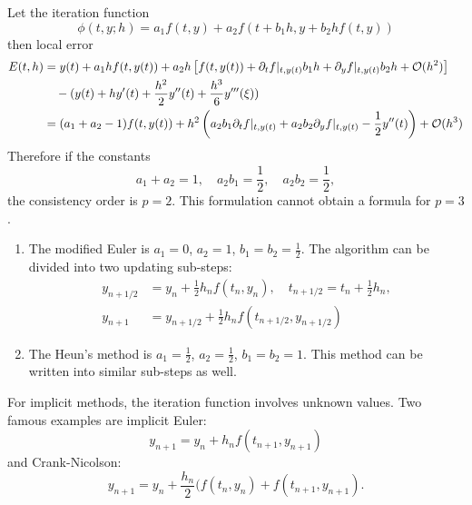 \begin{example}
    Let the iteration function $$\phi(t, y;h) = a_1 f(t, y ) + a_2f( t+b_1h, y+b_2 hf(t, y))$$
    then local error
    \begin{equation}\nonumber
        \begin{aligned}
            E(t, h) &= y(t) + a_1 h f(t, y(t)) + a_2 h \left[ f(t, y(t)) + \partial_t f|_{t,y(t)} b_1 h + \partial_y f|_{t, y(t)} b_2 h +\mathcal O(h^2) \right]\\
            &\quad - (y(t) + h y'(t) + \frac{h^2}{2} y''(t) + \frac{h^3}{6}y'''(\xi))\\
            & = (a_1 + a_2 - 1) f(t, y(t)) + h^2 \left( a_2 b_1 \partial_t f|_{t,y(t)} + a_2 b_2 \partial_y f|_{t, y(t)}-\frac{1}{2}y''(t)\right) + \mathcal O(h^3)
        \end{aligned}
    \end{equation}
    Therefore if the constants
    $$a_1 + a_2 = 1,\quad a_2b_1 = \frac{1}{2},\quad a_2 b_2 = \frac{1}{2},$$
    the consistency order is $p = 2$. This formulation cannot obtain a formula for $p=3$. 
    \begin{enumerate}
        \item     The modified Euler is $a_1 = 0$, $a_2= 1$, $b_1 = b_2 = \frac{1}{2}$. The algorithm can be divided into two updating sub-steps:
        \begin{equation}
            \begin{aligned}
                y_{n+1/2} &= y_n + \frac{1}{2}h_n f(t_n, y_n),\quad t_{n+1/2} = t_n + \frac{1}{2}h_n, \\
                y_{n+1} &= y_{n+1/2} + \frac{1}{2} h_n f(t_{n+1/2}, y_{n+1/2})
            \end{aligned}
        \end{equation}
        \item The Heun's method is $a_1 = \frac{1}{2}$, $a_2 = \frac{1}{2}$, $b_1 = b_2 = 1$. This method can be written into similar sub-steps as well.
    \end{enumerate}
\end{example}
\begin{remark}
    For implicit methods, the iteration function involves unknown values. Two famous examples are implicit Euler:
    $$y_{n+1} = y_n + h_n f(t_{n+1}, y_{n+1})$$
    and Crank-Nicolson:
    $$y_{n+1} = y_n + \frac{h_n}{2} ( f(t_n, y_n) + f(t_{n+1}, y_{n+1}).$$
\end{remark}

